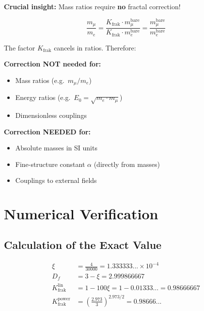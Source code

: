 	\textbf{Crucial insight:} Mass ratios require \textbf{no} fractal correction!
	
	\begin{equation}
		\frac{m_\mu}{m_e} = \frac{K_{\text{frak}} \cdot m_\mu^{\text{bare}}}{K_{\text{frak}} \cdot m_e^{\text{bare}}} = \frac{m_\mu^{\text{bare}}}{m_e^{\text{bare}}}
		\label{eq:ratio_correction_free_en}
	\end{equation}
	
	The factor $K_{\text{frak}}$ cancels in ratios. Therefore:
	
	\begin{tcolorbox}[colback=green!5!white,colframe=green!75!black,title={When is $K_{\text{frak}}$ needed?}]
		\textbf{Correction NOT needed for:}
		\begin{itemize}
			\item Mass ratios (e.g.\ $m_\mu/m_e$)
			\item Energy ratios (e.g.\ $E_0 = \sqrt{m_e \cdot m_\mu}$)
			\item Dimensionless couplings
		\end{itemize}
		
		\textbf{Correction NEEDED for:}
		\begin{itemize}
			\item Absolute masses in SI units
			\item Fine-structure constant $\alpha$ (directly from masses)
			\item Couplings to external fields
		\end{itemize}
	\end{tcolorbox}
	
	\section{Numerical Verification}
	
	\subsection{Calculation of the Exact Value}
	
	\begin{align}
		\xi &= \frac{4}{30000} = 1.333333... \times 10^{-4} \\
		D_f &= 3 - \xi = 2.999866667 \\
		K_{\text{frak}}^{\text{lin}} &= 1 - 100\xi = 1 - 0.01333... = 0.98666667 \\
		K_{\text{frak}}^{\text{power}} &= \left(\frac{2.973}{3}\right)^{2.973/2} = 0.98666...
	\end{align}
	
